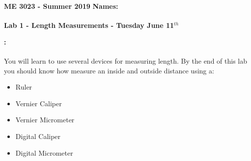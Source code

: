 \documentclass[11pt]{article}
\begin{document}
	\textbf{\LARGE ME 3023 - Summer 2019} \hspace{10 mm} \textbf {Names: \underline{\hspace{90 mm}}}\\\\
	\textbf{\LARGE Lab 1 - Length Measurements - Tuesday June 11$^{th}$} \\

	

	\begin{description}
        \vspace{3mm}
		\item [\textbf{ \Large Overview}] \textbf{ \Large :}\\\\
			You will learn to use several devices for measuring length. By the end of this lab you should know how measure an inside and outside distance using a: 
 		\begin{multicols}{2}
 		\begin{itemize}
 			\item Ruler
 			\item Vernier Caliper
 			\item Vernier Micrometer
 			\item Digital Caliper
 			\item Digital Micrometer
 		\end{itemize}
 		\end{multicols}
 	 \vspace{3mm}
 	 

\end{description}
\end{document}
